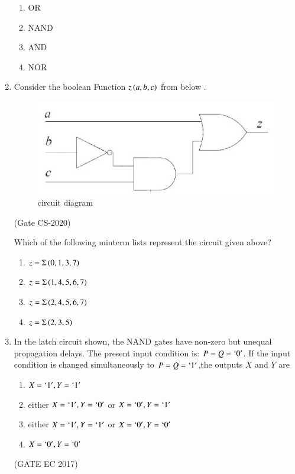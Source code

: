 \begin{enumerate}
	      \begin{enumerate}
		      \item OR
		      \item NAND
		      \item AND
		      \item NOR
	      \end{enumerate}
	\item Consider the boolean Function $z\left(a,b,c\right)$ from below .
	      \begin{figure}[H]
		      \centering
		      \includegraphics[width=\columnwidth]{figs/203.png}
		      \caption{circuit diagram}
	      \end{figure}

	      \hfill{(Gate CS-2020)}

	      Which of the following minterm lists represent the circuit given above?
	      \begin{enumerate}
		      \item $z=\Sigma\left(0,1,3,7\right)$
		      \item $z=\Sigma\left(1,4,5,6,7\right)$
		      \item $z=\Sigma\left(2,4,5,6,7\right)$
		      \item $z=\Sigma\left(2,3,5\right)$
	      \end{enumerate}
	\item In the latch circuit shown, the NAND gates have non-zero but unequal propagation delays. The present input condition is: $P=Q=\lq 0\rq$. If the input condition is changed simultaneously to $P=Q=\lq 1\rq$,the outputs $X$ and $Y$ are
	      \begin{figure}[H]
		      \centering
		      \label{figure_1}
		      
	      \end{figure}
	      \begin{enumerate}
		      \item $X=\lq 1\rq,Y=\lq 1 \rq$
		      \item either $X=\lq 1\rq,Y=\lq 0\rq$ or $X=\lq 0\rq,Y=\lq 1\rq$
		      \item either $X=\lq 1\rq,Y=\lq 1\rq$ or $X=\lq 0\rq,Y=\lq 0\rq$
		      \item $X=\lq 0\rq,Y=\lq 0 \rq$
	      \end{enumerate}
	      \hfill(GATE EC 2017)


\end{enumerate}

